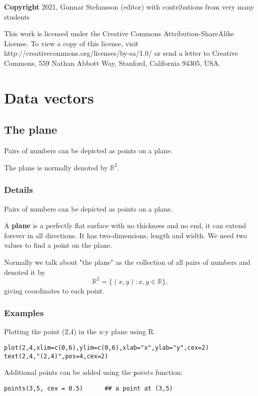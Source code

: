 \documentclass[12pt,a4paper]{article}
\theoremstyle{regla}
\theoremstyle{remark}
\theoremstyle{definition}
\theoremstyle{nonumberbreak}
\begin{document}
{\bf Copyright}
2021, Gunnar Stefansson (editor) with contributions from very many students

This work is licensed under the Creative Commons
Attribution-ShareAlike License. To view a copy of this license, visit
http://creativecommons.org/licenses/by-sa/1.0/ or send a letter to
Creative Commons, 559 Nathan Abbott Way, Stanford, California 94305,
USA.
\clearpage
\section{Data vectors}
\subsection{The plane}
\begin{fbox}
\begin{minipage}{0.97\textwidth}
Pairs of numbers can be depicted as points on a plane.

The plane is normally denoted by $\mathbb{R}^2$.
\end{minipage}
\end{fbox}
\subsubsection{Details}
Pairs of numbers can be depicted as points on a plane.\\

\begin{defn}
A {\bf plane} is a perfectly flat surface with no thickness and no end, it can extend forever in all directions. It has two-dimensions, length and width. We need two values to find a point on the plane. 
\end{defn}

Normally we talk about "the plane" as the collection of all pairs of numbers and denoted it by 
$$
\mathbb{R}^2 = \{ (x,y) : x,y \in \mathbb{R} \},
$$ 
giving coordinates to each point.


\subsubsection{Examples}
\begin{xmpl}
Plotting the point (2,4) in the x-y plane using R.
\begin{lstlisting}
plot(2,4,xlim=c(0,6),ylim=c(0,6),xlab="x",ylab="y",cex=2)
text(2,4,"(2,4)",pos=4,cex=2)
\end{lstlisting}

Additional points can be added using the $\texttt points$ function:

\begin{lstlisting}
points(3,5, cex = 0.5)      ## a point at (3,5)
\end{lstlisting}

\end{xmpl}
\end{document}
